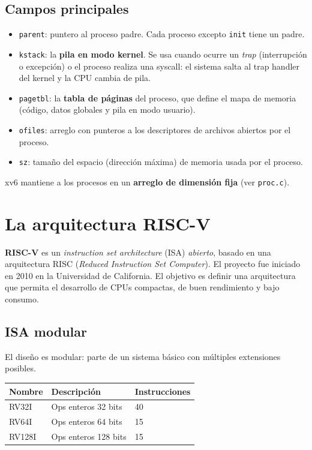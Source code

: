 \documentclass[11pt,a4paper]{article}
\begin{document}
\subsection{Campos principales}

\begin{itemize}[leftmargin=*]
    \item \texttt{parent}: puntero al proceso padre. Cada proceso
        excepto \texttt{init} tiene un padre.
    \item \texttt{kstack}: la \textbf{pila en modo kernel}. Se usa
        cuando ocurre un \emph{trap} (interrupción o excepción) o el
        proceso realiza una syscall: el sistema salta al trap handler
        del kernel y la CPU cambia de pila.
    \item \texttt{pagetbl}: la \textbf{tabla de páginas} del proceso,
        que define el mapa de memoria (código, datos globales y pila
        en modo usuario).
    \item \texttt{ofiles}: arreglo con punteros a los descriptores de
        archivos abiertos por el proceso.
    \item \texttt{sz}: tamaño del espacio (dirección máxima) de memoria
        usada por el proceso.
\end{itemize}

xv6 mantiene a los procesos en un \textbf{arreglo de dimensión fija}
(ver \texttt{proc.c}).

\section{La arquitectura RISC-V}

\textbf{RISC-V} es un \emph{instruction set architecture} (ISA)
\emph{abierto}, basado en una arquitectura RISC (\emph{Reduced
Instruction Set Computer}). El proyecto fue iniciado en 2010 en la
Universidad de California. El objetivo es definir una arquitectura
que permita el desarrollo de CPUs compactas, de buen rendimiento y
bajo consumo.

\subsection{ISA modular}

El diseño es modular: parte de un sistema básico con múltiples
extensiones posibles.

\begin{center}\small
\begin{tabular}{@{}lll@{}}
\toprule
\textbf{Nombre} & \textbf{Descripción} & \textbf{Instrucciones} \\
\midrule
RV32I  & Ops enteros 32 bits  & 40 \\
RV64I  & Ops enteros 64 bits  & 15 \\
RV128I & Ops enteros 128 bits & 15 \\
\bottomrule
\end{tabular}
\end{center}
\end{document}
